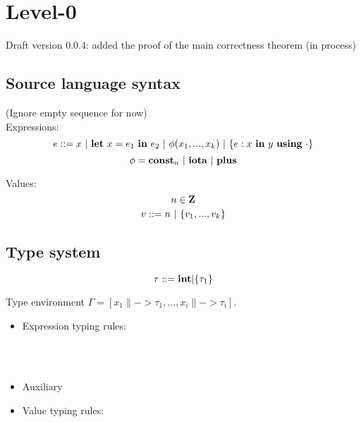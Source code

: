 \providecommand{\versionnumber}{0.0.4}


\section{Level-0}

Draft version \versionnumber: added the proof of the main correctness theorem (in process)

\subsection{Source language syntax}
(Ignore empty sequence for now)\\
Expressions:
$$e ::= x \ | \ \Let{x}{e_1}{e_2} \ | \ \hcall{\Tupk{x}} \ | \ \Comp{e}{x}{y}{\cdot} $$
$$\phi = \mathbf{const}_n \ | \ \mathbf{iota} \ | \ \mathbf{plus} $$ 

Values: \\
$$ n \in \mathbf{Z} $$
$$ v::= n \ | \ \{ v_1,...,v_k \}$$

\subsection{Type system}
$$\tau ::= \mathbf{int} | \{\tau_1\}$$

Type environment $\Gamma = [x_1 \|-> \tau_1, ..., x_i \|-> {\tau_i} ]$.
\begin{itemize}

\item Expression typing rules:\\


\\[1ex]


\\[2ex]


\item Auxiliary \Jug{\Type{}{\TypeF} {\Tupk{\tau} \-> \tau}}


\item Value typing rules: \\



\end{itemize}

